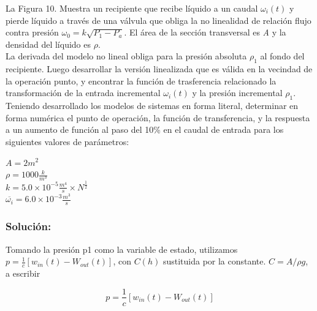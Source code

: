 \documentclass[a4paper,12pt,twoside]{proyectotanquesecci}
\begin{document}
La Figura 10. Muestra un recipiente que recibe líquido a un caudal $\omega_{i}\left(t\right)$ y pierde  líquido a través de una válvula que obliga la no linealidad de relación flujo contra presión $\omega _{0}=k\sqrt {P_{1}-P_{a}}$. El área de la sección transversal es \textit{A} y la densidad del líquido es  $\rho$. \\
La derivada del modelo no lineal obliga para la presión absoluta $\rho_{1}$ al fondo del recipiente. Luego desarrollar la versión linealizada que es válida en la vecindad de la operación punto, y encontrar la función de trasferencia relacionado la transformación de la entrada incremental $\omega_{i}\left(t\right)$ y la presión incremental $\rho_{1}$. \\


Teniendo desarrollado los modelos de sistemas en forma literal, determinar en forma numérica el punto de operación, la función de transferencia, y la respuesta a un aumento de función al paso del 10\% en el caudal de entrada para los siguientes valores de parámetros:

\begin{center}
$A=2m^{2}$ \\
$\rho=1000\frac {k}{m^{3}}$ \\
$k=5.0\times 10^{-5}\frac {m^{4}}{s}\times N^{\frac {1}{2}}$ \\
$\overline{\omega _{i}}=6.0\times 10^{-3}\frac {m^{3}}{s}$ \\
\end{center}

\subsubsection{Solución:}

Tomando la presión p1 como la variable de estado, utilizamos $p=\frac {1}{c}\left[ w_{in}\left( t\right) -W_{out}\left( t\right) \right]$, con $C\left(h\right)$ sustituida por la constante. $C=A/\rho g$, a escribir

\begin{equation}
p=\frac {1}{c}\left[ w_{in}\left( t\right) -W_{out}\left( t\right) \right]
\end{equation}
\end{document}

